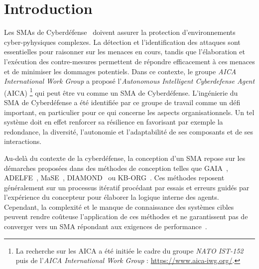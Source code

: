 \documentclass[contribution]{jfsma}
\begin{document}

\section{Introduction}


Les SMAs de Cyberdéfense~\cite{Kott2023, Singh2015} doivent assurer la protection d'environnements cyber-pyhysiques complexes.  La détection et l'identification des attaques sont essentielles pour raisonner sur les menaces en cours, tandis que l'élaboration et l'exécution des contre-mesures permettent de répondre efficacement à ces menaces et de minimiser les dommages potentiels. Dans ce contexte, le groupe \emph{AICA International Work Group} a proposé l'\emph{Autonomous Intelligent Cyberdefense Agent} (AICA)
\footnote{La recherche sur les AICA a été initiée le cadre du groupe \emph{NATO IST-152} puis de l'\emph{AICA International Work Group} : \url{https://www.aica-iwg.org/}. }
qui peut être vu comme un SMA de Cyberdéfense. L'ingénierie du SMA de Cyberdéfense a été identifiée par ce groupe de travail comme un défi important, en particulier pour ce qui concerne les aspects organisationnels. %
Un tel système doit en effet renforcer sa résilience en favorisant par exemple la redondance, la diversité, l'autonomie et l'adaptabilité de ses composants et de ses interactions.


Au-delà du contexte de la cyberdéfense, la conception d'un SMA repose sur les démarches proposées dans des méthodes de conception telles que GAIA~\cite{Wooldridge2000,Cernuzzi2014}, ADELFE~\cite{Mefteh2015}, MaSE~\cite{Deloach2001}, DIAMOND~\cite{Jamont2015} ou KB-ORG~\cite{Sims2008}.
Ces méthodes reposent généralement sur un processus itératif procédant par essais et erreurs guidés par l'expérience du concepteur pour élaborer la logique interne des agents. Cependant, la complexité et le manque de connaissance des systèmes cibles peuvent rendre coûteuse l'application de ces méthodes et ne garantissent pas de converger vers un SMA répondant aux exigences de performance~\cite{Mefteh2013}.
\end{document}
